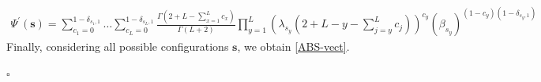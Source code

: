 \documentclass[11pt]{article}
\numberwithin{equation}{section}
\numberwithin{equation}{subsection}
\begin{document}
\begin{equation}\label{elementsABS}
	\begin{split}
		\Psi^{'}(\mathbf{s})=\sum_{c_{1}=0}^{1-\delta_{s_{1},1}}\ldots\sum_{c_{L}=0}^{1-\delta_{s_{L},1}}\frac{\Gamma(2+L-\sum_{x=1}^{L}c_{x})}{\Gamma(L+2)}\prod_{y=1}^{L}\left(\lambda_{s_{y}}\left(2+L-y-\sum_{j=y}^{L}c_{j}\right)\right)^{c_{y}}\left(\beta_{s_{y}}\right)^{(1-c_{y})(1-\delta_{s_{y},1})}
	\end{split}
\end{equation} 
Finally, considering all possible configurations $\bm{s}$, we obtain \eqref{ABS-vect}.
\begin{flushright}
    $\square$
\end{flushright}
\end{document}
